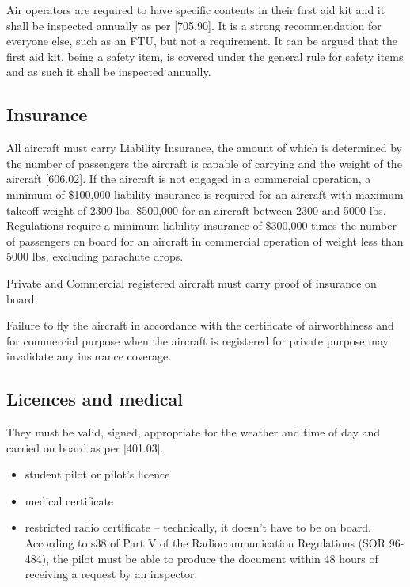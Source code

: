 \documentclass[12pt,letterpaper]{article}
\begin{document}
    Air operators are required to have specific contents in their first aid kit and it shall be inspected annually as per [705.90]. It is a strong recommendation for everyone else, such as an FTU, but not a requirement. It can be argued that the first aid kit, being a safety item, is covered under the general rule for safety items and as such it shall be inspected annually.

    \subsection{Insurance}
    
    All aircraft must carry Liability Insurance, the amount of which is determined by the number of passengers the aircraft is capable of carrying and the weight of the aircraft [606.02]. If the aircraft is not engaged in a commercial operation, a minimum of \$100,000 liability insurance is required for an aircraft with maximum takeoff weight of 2300 lbs, \$500,000 for an aircraft between 2300 and 5000 lbs. Regulations require a minimum liability insurance of \$300,000 times the number of passengers on board for an aircraft in commercial operation of weight less than 5000 lbs, excluding parachute drops.
    
    Private and Commercial registered aircraft must carry proof of insurance on board.
    
    Failure to fly the aircraft in accordance with the certificate of airworthiness and for commercial purpose when the aircraft is registered for private purpose may invalidate any insurance coverage.
        
    \subsection{Licences and medical}
    
    They must be valid, signed, appropriate for the weather and time of day and carried on board as per [401.03].
    \begin{itemize}
        \item student pilot or pilot’s licence
        \item medical certificate
        \item restricted radio certificate -- technically, it doesn't have to be on board. According to s38 of Part V of the Radiocommunication Regulations (SOR 96-484), the pilot must be able to produce the document within 48 hours of receiving a request by an inspector.
    \end{itemize}
\end{document}
